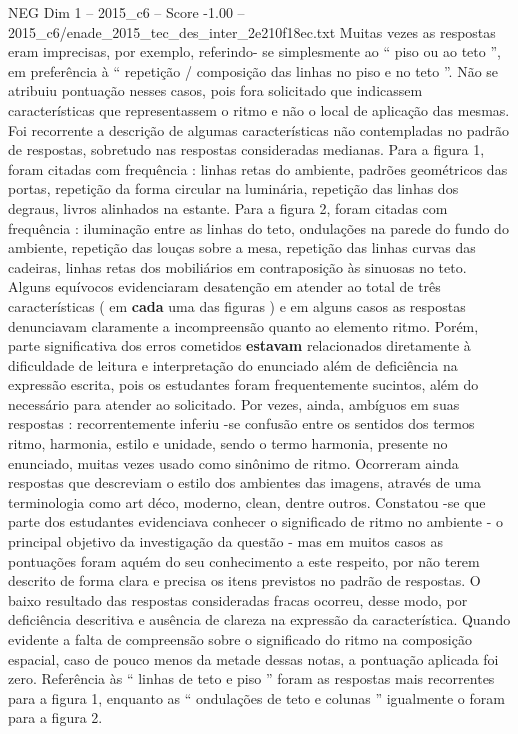 \begin{textsample}{NEG Dim 1 – 2015\_c6 – Score -1.00 – 2015\_c6/enade\_2015\_tec\_des\_inter\_2e210f18ec.txt}
Muitas vezes as respostas eram imprecisas, por exemplo, referindo- se simplesmente ao “ piso ou ao teto ”, em preferência à “ repetição / composição das linhas no piso e no teto ”.
Não se atribuiu pontuação nesses casos, pois fora solicitado que indicassem características que representassem o ritmo e não o local de aplicação das mesmas.
Foi recorrente a descrição de algumas características não contempladas no padrão de respostas, sobretudo nas respostas consideradas medianas.
Para a figura 1, foram citadas com frequência : linhas retas do ambiente, padrões geométricos das portas, repetição da forma circular na luminária, repetição das linhas dos degraus, livros alinhados na estante.
Para a figura 2, foram citadas com frequência : iluminação entre as linhas do teto, ondulações na parede do fundo do ambiente, repetição das louças sobre a mesa, repetição das linhas curvas das cadeiras, linhas retas dos mobiliários em contraposição às sinuosas no teto.
Alguns equívocos evidenciaram desatenção em atender ao total de três características ( em \textbf{cada} uma das figuras ) e em alguns casos as respostas denunciavam claramente a incompreensão quanto ao elemento ritmo.
Porém, parte significativa dos erros cometidos \textbf{estavam} relacionados diretamente à dificuldade de leitura e interpretação do enunciado além de deficiência na expressão escrita, pois os estudantes foram frequentemente sucintos, além do necessário para atender ao solicitado.
Por vezes, ainda, ambíguos em suas respostas : recorrentemente inferiu -se confusão entre os sentidos dos termos ritmo, harmonia, estilo e unidade, sendo o termo harmonia, presente no enunciado, muitas vezes usado como sinônimo de ritmo.
Ocorreram ainda respostas que descreviam o estilo dos ambientes das imagens, através de uma terminologia como art déco, moderno, clean, dentre outros.
Constatou -se que parte dos estudantes evidenciava conhecer o significado de ritmo no ambiente - o principal objetivo da investigação da questão - mas em muitos casos as pontuações foram aquém do seu conhecimento a este respeito, por não terem descrito de forma clara e precisa os itens previstos no padrão de respostas.
O baixo resultado das respostas consideradas fracas ocorreu, desse modo, por deficiência descritiva e ausência de clareza na expressão da característica.
Quando evidente a falta de compreensão sobre o significado do ritmo na composição espacial, caso de pouco menos da metade dessas notas, a pontuação aplicada foi zero.
Referência às “ linhas de teto e piso ” foram as respostas mais recorrentes para a figura 1, enquanto as “ ondulações de teto e colunas ” igualmente o foram para a figura 2.

\end{textsample}
